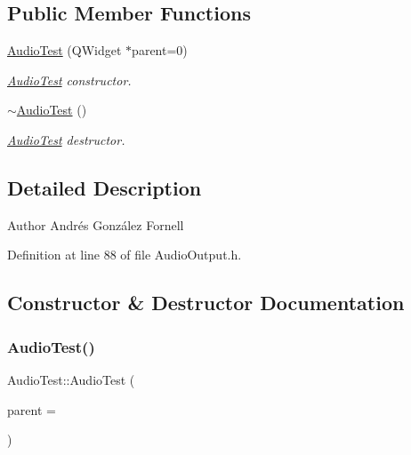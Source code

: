 \subsection*{Public Member Functions}
\begin{DoxyCompactItemize}
\item 
\hyperlink{class_audio_test_a8732c48308ca1352a4d89803553b395e}{Audio\+Test} (Q\+Widget $\ast$parent=0)
\begin{DoxyCompactList}\small\item\em \hyperlink{class_audio_test}{Audio\+Test} constructor. \end{DoxyCompactList}\item 
\mbox{\label{class_audio_test_ae37879db71b1540d84aa37a093978192}} 
\hyperlink{class_audio_test_ae37879db71b1540d84aa37a093978192}{$\sim$\+Audio\+Test} ()
\begin{DoxyCompactList}\small\item\em \hyperlink{class_audio_test}{Audio\+Test} destructor. \end{DoxyCompactList}\end{DoxyCompactItemize}


\subsection{Detailed Description}
\begin{DoxyAuthor}{Author}
Andrés González Fornell 
\end{DoxyAuthor}


Definition at line 88 of file Audio\+Output.\+h.



\subsection{Constructor \& Destructor Documentation}
\mbox{\label{class_audio_test_a8732c48308ca1352a4d89803553b395e}} 
\subsubsection{\texorpdfstring{Audio\+Test()}{AudioTest()}}
{\footnotesize\ttfamily Audio\+Test\+::\+Audio\+Test (\begin{DoxyParamCaption}\item[{Q\+Widget $\ast$}]{parent = {} }\end{DoxyParamCaption})}


